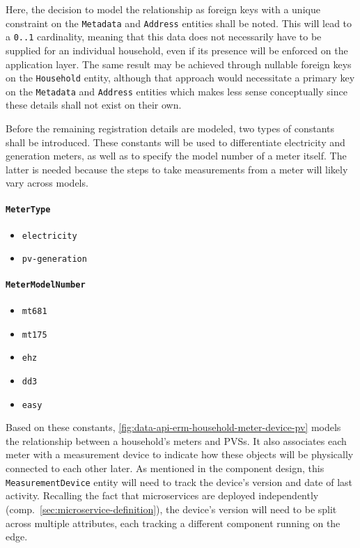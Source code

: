 \FloatBarrier

Here, the decision to model the relationship as foreign keys with a unique constraint on the \texttt{Metadata} and \texttt{Address} entities shall be noted. This will lead to a \texttt{0..1} cardinality, meaning that this data does not necessarily have to be supplied for an individual household, even if its presence will be enforced on the application layer. The same result may be achieved through nullable foreign keys on the \texttt{Household} entity, although that approach would necessitate a primary key on the \texttt{Metadata} and \texttt{Address} entities which makes less sense conceptually since these details shall not exist on their own.

Before the remaining registration details are modeled, two types of constants shall be introduced. These constants will be used to differentiate electricity and generation meters, as well as to specify the model number of a meter itself. The latter is needed because the steps to take measurements from a meter will likely vary across models.

\begin{multicols}{2}

\paragraph{\texttt{MeterType}}
\begin{itemize}
  \item \texttt{electricity}
  \item \texttt{pv-generation}
\end{itemize}

\vfill\null
\columnbreak

\paragraph{\texttt{MeterModelNumber}}
\begin{itemize}
  \item \texttt{mt681}
  \item \texttt{mt175}
  \item \texttt{ehz}
  \item \texttt{dd3}
  \item \texttt{easy}
\end{itemize}

\end{multicols}

Based on these constants, \autoref{fig:data-api-erm-household-meter-device-pv} models the relationship between a household's meters and \acsp{PVS}. It also associates each meter with a measurement device to indicate how these objects will be physically connected to each other later. As mentioned in the component design, this \texttt{MeasurementDevice} entity will need to track the device's version and date of last activity. Recalling the fact that microservices are deployed independently (comp.~\autoref{sec:microservice-definition}), the device's version will need to be split across multiple attributes, each tracking a different component running on the edge.

